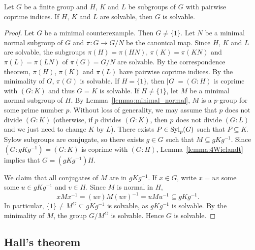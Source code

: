 \begin{theorem}[Wielandt]
	\label{theorem:Wielandt:solvable}
	Let $G$ be a finite group and $H$, $K$ and $L$ be 
        subgroups of $G$ with pairwise coprime indices. 
        If $H$, $K$ and $L$ are solvable, then $G$ is 
	solvable.
\end{theorem}


\begin{proof}
    Let $G$ be a minimal counterexample. Then $G\ne\{1\}$. Let $N$
	be a minimal normal subgroup of $G$ and $\pi\colon G\to G/N$ be the canonical map. Since $H$, $K$ and $L$ are solvable, 
	the subgroups $\pi(H)=\pi(HN)$, $\pi(K)=\pi(KN)$ and $\pi(L)=\pi(LN)$ of $\pi(G)=G/N$ are solvable. 
	By the correspondence theorem, $\pi(H)$, $\pi(K)$ and $\pi(L)$ 
        have pairwise coprime indices. 
    By the minimality of $G$, $\pi(G)$ is solvable. If $H=\{1\}$, then 
    $|G|=(G:H)$ is coprime with $(G:K)$ and thus $G=K$ is solvable. If 
    $H\ne \{1\}$, let $M$ be a minimal normal subgroup of $H$. By Lemma~\ref{lemma:minimal_normal}, 
    $M$ is a $p$-group for some prime number $p$. 
    Without loss of generality, we may assume that $p$ does not divide $(G:K)$ (otherwise, if $p$ divides $(G:K)$, then 
    $p$ does not divide $(G:L)$ and we just need to change $K$ by $L$). 
    There exists $P\in\mathrm{Syl}_p(G)$ such that $P\subseteq K$. Sylow subgroups are conjugate, so there exists 
    $g\in G$ such that $M\subseteq
	gKg^{-1}$. Since $(G:gKg^{-1})=(G:K)$ is coprime with $(G:H)$, Lemma~\ref{lemma:4Wielandt} implies that
    $G=(gKg^{-1})H$. 
	
    We claim that all conjugates of $M$ are in $gKg^{-1}$. 
    If $x\in G$, write $x=uv$ some some $u\in 
	gKg^{-1}$ and $v\in H$. Since $M$ is normal in $H$, 
	\[
	xMx^{-1}=(uv)M(uv)^{-1}=uMu^{-1}\subseteq gKg^{-1}.
	\]
	In particular, $\{1\}\ne M^G\subseteq gKg^{-1}$ is solvable, as $gKg^{-1}$ is 
	solvable. By the minimality of $M$, the group $G/M^G$ is solvable. Hence 
        $G$ is solvable. 
\end{proof}

\subsection{Hall's theorem}

